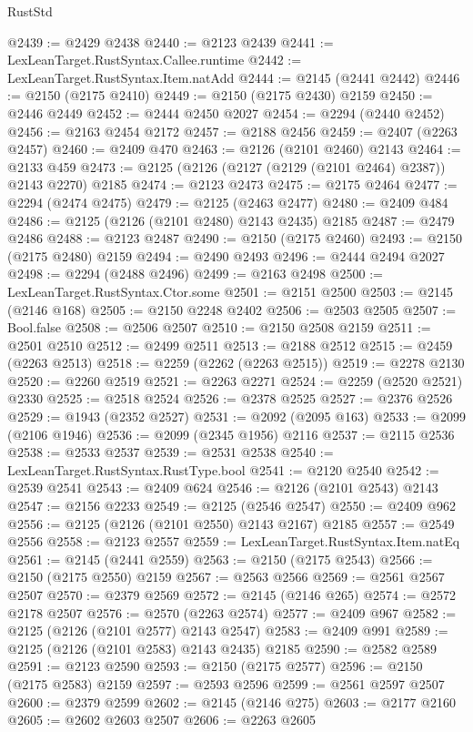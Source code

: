 \begin{lexlean}{RustStd}
\begin{coremodule}
@2439 := @2429 @2438
@2440 := @2123 @2439
@2441 := LexLeanTarget.RustSyntax.Callee.runtime
@2442 := LexLeanTarget.RustSyntax.Item.natAdd
@2444 := @2145 (@2441 @2442)
@2446 := @2150 (@2175 @2410)
@2449 := @2150 (@2175 @2430) @2159
@2450 := @2446 @2449
@2452 := @2444 @2450 @2027
@2454 := @2294 (@2440 @2452)
@2456 := @2163 @2454 @2172
@2457 := @2188 @2456
@2459 := @2407 (@2263 @2457)
@2460 := @2409 @470
@2463 := @2126 (@2101 @2460) @2143
@2464 := @2133 @459
@2473 := @2125 (@2126 (@2127 (@2129 (@2101 @2464) @2387)) @2143 @2270) @2185
@2474 := @2123 @2473
@2475 := @2175 @2464
@2477 := @2294 (@2474 @2475)
@2479 := @2125 (@2463 @2477)
@2480 := @2409 @484
@2486 := @2125 (@2126 (@2101 @2480) @2143 @2435) @2185
@2487 := @2479 @2486
@2488 := @2123 @2487
@2490 := @2150 (@2175 @2460)
@2493 := @2150 (@2175 @2480) @2159
@2494 := @2490 @2493
@2496 := @2444 @2494 @2027
@2498 := @2294 (@2488 @2496)
@2499 := @2163 @2498
@2500 := LexLeanTarget.RustSyntax.Ctor.some
@2501 := @2151 @2500
@2503 := @2145 (@2146 @168)
@2505 := @2150 @2248 @2402
@2506 := @2503 @2505
@2507 := Bool.false
@2508 := @2506 @2507
@2510 := @2150 @2508 @2159
@2511 := @2501 @2510
@2512 := @2499 @2511
@2513 := @2188 @2512
@2515 := @2459 (@2263 @2513)
@2518 := @2259 (@2262 (@2263 @2515))
@2519 := @2278 @2130
@2520 := @2260 @2519
@2521 := @2263 @2271
@2524 := @2259 (@2520 @2521) @2330
@2525 := @2518 @2524
@2526 := @2378 @2525
@2527 := @2376 @2526
@2529 := @1943 (@2352 @2527)
@2531 := @2092 (@2095 @163)
@2533 := @2099 (@2106 @1946)
@2536 := @2099 (@2345 @1956) @2116
@2537 := @2115 @2536
@2538 := @2533 @2537
@2539 := @2531 @2538
@2540 := LexLeanTarget.RustSyntax.RustType.bool
@2541 := @2120 @2540
@2542 := @2539 @2541
@2543 := @2409 @624
@2546 := @2126 (@2101 @2543) @2143
@2547 := @2156 @2233
@2549 := @2125 (@2546 @2547)
@2550 := @2409 @962
@2556 := @2125 (@2126 (@2101 @2550) @2143 @2167) @2185
@2557 := @2549 @2556
@2558 := @2123 @2557
@2559 := LexLeanTarget.RustSyntax.Item.natEq
@2561 := @2145 (@2441 @2559)
@2563 := @2150 (@2175 @2543)
@2566 := @2150 (@2175 @2550) @2159
@2567 := @2563 @2566
@2569 := @2561 @2567 @2507
@2570 := @2379 @2569
@2572 := @2145 (@2146 @265)
@2574 := @2572 @2178 @2507
@2576 := @2570 (@2263 @2574)
@2577 := @2409 @967
@2582 := @2125 (@2126 (@2101 @2577) @2143 @2547)
@2583 := @2409 @991
@2589 := @2125 (@2126 (@2101 @2583) @2143 @2435) @2185
@2590 := @2582 @2589
@2591 := @2123 @2590
@2593 := @2150 (@2175 @2577)
@2596 := @2150 (@2175 @2583) @2159
@2597 := @2593 @2596
@2599 := @2561 @2597 @2507
@2600 := @2379 @2599
@2602 := @2145 (@2146 @275)
@2603 := @2177 @2160
@2605 := @2602 @2603 @2507
@2606 := @2263 @2605

\end{coremodule}
\end{lexlean}
